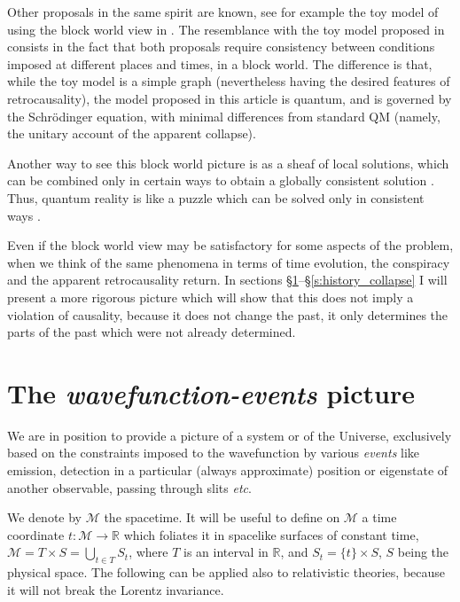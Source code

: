 \documentclass[12pt]{amsart}
\theoremstyle{definition}
\theoremstyle{plain}
\begin{document}
Other proposals in the same spirit are known, see for example the toy model of using the block world view in \cite{price2008toyRetrocausality}. The resemblance with the toy model proposed in \cite{price2008toyRetrocausality} consists in the fact that both proposals require consistency between conditions imposed at different places and times, in a block world. The difference is that, while the toy model is a simple graph (nevertheless having the desired features of retrocausality), the model proposed in this article is quantum, and is governed by the Schr\"odinger equation, with minimal differences from standard QM (namely, the unitary account of the apparent collapse).

Another way to see this block world picture is as a sheaf of local solutions, which can be combined only in certain ways to obtain a globally consistent solution \cite{Sto12QMc}. Thus, quantum reality is like a puzzle which can be solved only in consistent ways \cite{Sto13bSpringer}.

Even if the block world view may be satisfactory for some aspects of the problem, when we think of the same phenomena in terms of time evolution, the conspiracy and the apparent retrocausality return.
In sections \S\ref{s:wavefunction-events-picture}--\S\ref{s:history_collapse} I will present a more rigorous picture which will show that this does not imply a violation of causality, because it does not change the past, it only determines the parts of the past which were not already determined.


\section{The \emph{wavefunction-events} picture}
\label{s:wavefunction-events-picture}

We are in position to provide a picture of a system or of the Universe, exclusively based on the constraints imposed to the wavefunction by various \emph{events} like emission, detection in a particular (always approximate) position or eigenstate of another observable, passing through slits \textit{etc}.

We denote by $\mathcal M$ the spacetime. It will be useful to define on $\mathcal M$ a time coordinate $t:\mathcal M\to\mathbb{R}$ which foliates it in spacelike surfaces of constant time, $\mathcal M=T\times S=\bigcup_{t\in T} S_t$, where $T$ is an interval in $\mathbb{R}$, and $S_t=\{t\}\times S$, $S$ being the physical space. The following can be applied also to relativistic theories, because it will not break the Lorentz invariance.
\end{document}

